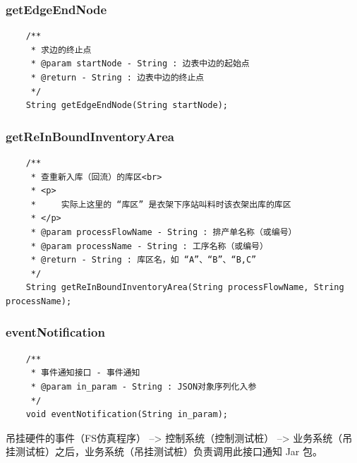 \subsubsection{getEdgeEndNode}
\begin{lstlisting}
    /**
     * 求边的终止点
     * @param startNode - String : 边表中边的起始点
     * @return - String : 边表中边的终止点
     */
    String getEdgeEndNode(String startNode);

\end{lstlisting}\vspace{-30pt}

\subsubsection{getReInBoundInventoryArea}
\begin{lstlisting}
    /**
     * 查重新入库（回流）的库区<br>
     * <p>
     *     实际上这里的 “库区” 是衣架下序站叫料时该衣架出库的库区
     * </p>
     * @param processFlowName - String : 排产单名称（或编号）
     * @param processName - String : 工序名称（或编号）
     * @return - String : 库区名，如 “A”、“B”、“B,C”
     */
    String getReInBoundInventoryArea(String processFlowName, String processName);
\end{lstlisting}\vspace{-30pt}

\subsubsection{eventNotification}
\begin{lstlisting}
    /**
     * 事件通知接口 - 事件通知
     * @param in_param - String : JSON对象序列化入参
     */
    void eventNotification(String in_param);
\end{lstlisting}\vspace{-30pt}
吊挂硬件的事件（FS仿真程序） --> 控制系统（控制测试桩） --> 业务系统（吊挂测试桩）之后，业务系统（吊挂测试桩）负责调用此接口通知 Jar 包。